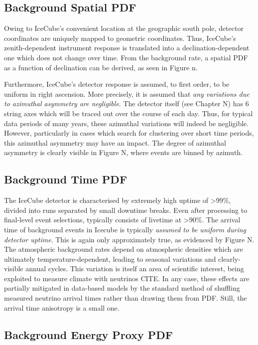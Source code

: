 \subsection{Background Spatial PDF}

Owing to IceCube's convenient location at the geographic south pole, detector coordinates are uniquely mapped to geometric coordinates. Thus, IceCube's zenith-dependent instrument response is translated into a declination-dependent one which does not change over time. From the background rate, a spatial PDF as a function of declination can be derived, as seen in Figure n.

Furthermore, IceCube's detector response is assumed, to first order, to be uniform in right ascension. More precisely, it is assumed that \emph{any variations due to azimuthal asymmetry are negligible}. The detector itself (see Chapter N) has 6 string axes which will be traced out over the course of each day. Thus, for typical data periods of many years, these azimuthal variations will indeed be negligible. However, particularly in cases which search for clustering over short time periods, this azimuthal asymmetry may have an impact. The degree of azimuthal asymmetry is clearly visible in Figure N, where events are binned by azimuth.

\subsection{Background Time PDF}

The IceCube detector is characterised by extremely high uptime of >99\%, divided into runs separated by small downtime breaks. Even after processing to final-level event selections, typically consists of livetime at >90\%. The arrival time of background events in Icecube is typically \emph{assumed to be uniform during detector uptime}. This is again only approximately true, as evidenced by Figure N. The atmospheric background rates depend on atmospheric densities which are ultimately temperature-dependent, leading to seasonal variations and clearly-visible annual cycles. This variation is itself an area of scientific interest, being exploited to measure climate with neutrinos CITE. In any case, these effects are partially mitigated in data-based models by the standard method of shuffling measured neutrino arrival times rather than drawing them from PDF. Still, the arrival time anisotropy is a small one.

\subsection{Background Energy Proxy PDF}

